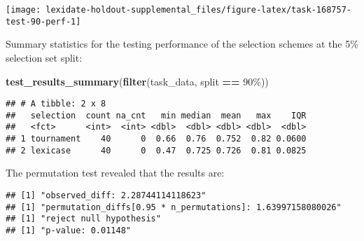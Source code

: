 \documentclass[
]{book}
\newenvironment{Shaded}{\begin{snugshade}}{\end{snugshade}}
\newcommand{\AttributeTok}[1]{\textcolor[rgb]{0.13,0.29,0.53}{#1}}
\newcommand{\DecValTok}[1]{\textcolor[rgb]{0.00,0.00,0.81}{#1}}
\newcommand{\FunctionTok}[1]{\textcolor[rgb]{0.13,0.29,0.53}{\textbf{#1}}}
\newcommand{\NormalTok}[1]{#1}
\newcommand{\OtherTok}[1]{\textcolor[rgb]{0.56,0.35,0.01}{#1}}
\newcommand{\SpecialCharTok}[1]{\textcolor[rgb]{0.81,0.36,0.00}{\textbf{#1}}}
\newcommand{\StringTok}[1]{\textcolor[rgb]{0.31,0.60,0.02}{#1}}
\begin{document}
\texttt{[image: lexidate-holdout-supplemental\_files/figure-latex/task-168757-test-90-perf-1]}

Summary statistics for the testing performance of the selection schemes at the 5\% selection set split:

\begin{Shaded}
\begin{Highlighting}[]
\FunctionTok{test\_results\_summary}\NormalTok{(}\FunctionTok{filter}\NormalTok{(task\_data, split }\SpecialCharTok{==} \StringTok{\textquotesingle{}90\%\textquotesingle{}}\NormalTok{))}
\end{Highlighting}
\end{Shaded}

\begin{verbatim}
## # A tibble: 2 x 8
##   selection  count na_cnt   min median  mean   max    IQR
##   <fct>      <int>  <int> <dbl>  <dbl> <dbl> <dbl>  <dbl>
## 1 tournament    40      0  0.66  0.76  0.752  0.82 0.0600
## 2 lexicase      40      0  0.47  0.725 0.726  0.81 0.0825
\end{verbatim}

The permutation test revealed that the results are:

\begin{Shaded}
\end{Shaded}

\begin{verbatim}
## [1] "observed_diff: 2.28744114118623"
## [1] "permutation_diffs[0.95 * n_permutations]: 1.63997158080026"
## [1] "reject null hypothesis"
## [1] "p-value: 0.01148"
\end{verbatim}
\end{document}
